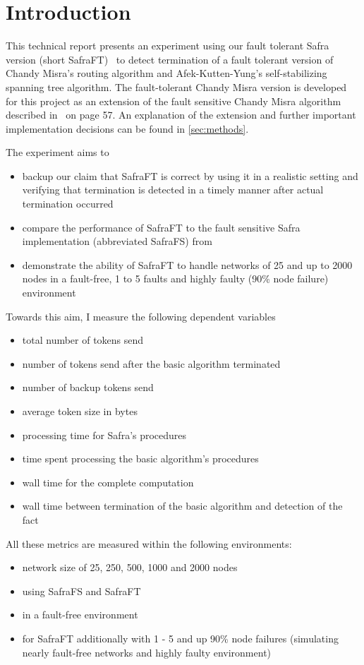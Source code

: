 \section{Introduction} 
This technical report presents an experiment using our fault tolerant Safra version (short SafraFT)~\cite{safraFT2018}
to detect termination of a fault tolerant version of Chandy Misra's routing algorithm and Afek-Kutten-Yung's self-stabilizing spanning tree algorithm.
The fault-tolerant Chandy Misra version is developed for this project as an extension of the fault sensitive Chandy Misra algorithm described in~\cite{Fokkink:2018} on page 57.
An explanation of the extension and further important implementation decisions can be found in \cref{sec:methods}.

The experiment aims to
\begin{itemize}
	\item backup our claim that SafraFT is correct by using it in a realistic setting and verifying that termination is detected in a timely manner after actual termination occurred
	\item compare the performance of SafraFT to the fault sensitive Safra implementation (abbreviated SafraFS) from \cite{demirbas2000optimal}
	\item demonstrate the ability of SafraFT to handle networks of 25 and up to 2000 nodes in a fault-free, 1 to 5 faults and highly faulty (90\% node failure) environment
\end{itemize}

Towards this aim, I measure the following dependent variables
\begin{itemize}
	\item total number of tokens send
	\item number of tokens send after the basic algorithm terminated
	\item number of backup tokens send
	\item average token size in bytes
	\item processing time for Safra's procedures
	\item time spent processing the basic algorithm's procedures 
	\item wall time for the complete computation
	\item wall time  between termination of the basic algorithm and detection of the fact
\end{itemize} 

All these metrics are measured within the following environments:
\begin{itemize}
	\item network size of 25, 250, 500, 1000 and 2000 nodes
	\item using SafraFS and SafraFT
	\item in a fault-free environment
	\item for SafraFT additionally with 1 - 5 and up 90\% node failures (simulating nearly fault-free networks and highly faulty environment)
\end{itemize}

